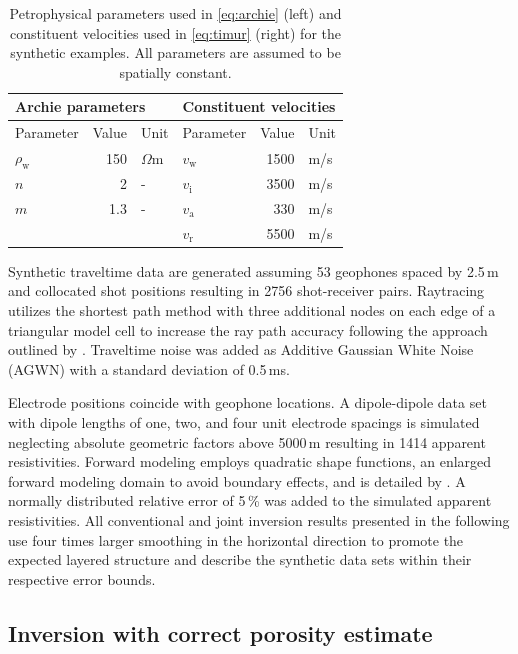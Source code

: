 \documentclass[extra]{gji}
\begin{document}
\begin{table}
 \centering
 \caption{Petrophysical parameters used in \autoref{eq:archie} (left) and constituent velocities used in \autoref{eq:timur} (right) for the synthetic examples. All parameters are assumed to be spatially constant.}
 \begin{tabular}{lrllrl}
  \toprule
  \multicolumn{3}{l}{\textbf{Archie parameters}} & \multicolumn{3}{l}{\textbf{Constituent velocities}} \\ \midrule
  Parameter       & Value & Unit      & Parameter    & Value & Unit \\ \midrule
  $\rho_\text{w}$ & 150   & $\Omega$m & $v_\text{w}$ & 1500  & m/s  \\
  $n$             & 2     & -         & $v_\text{i}$ & 3500  & m/s  \\
  $m$             & 1.3   & -         & $v_\text{a}$ & 330   & m/s  \\
                  &       &           & $v_\text{r}$ & 5500  & m/s  \\
  \bottomrule
 \end{tabular}
 \label{tab:parameters}
\end{table}

Synthetic traveltime data are generated assuming 53 geophones spaced by 2.5\,m and collocated shot positions resulting in 2756 shot-receiver pairs.
Raytracing utilizes the shortest path method with three additional nodes on each edge of a triangular model cell to increase the ray path accuracy following the approach outlined by \cite{Giroux2013}.
Traveltime noise was added as Additive Gaussian White Noise (AGWN) with a standard deviation of 0.5\,ms.

Electrode positions coincide with geophone locations.
A dipole-dipole data set with dipole lengths of one, two, and four unit electrode spacings is simulated neglecting absolute geometric factors above 5000\,m resulting in 1414 apparent resistivities.
Forward modeling employs quadratic shape functions, an enlarged forward modeling domain to avoid boundary effects, and is detailed by \cite{Ruecker2006}.
A normally distributed relative error of 5\,\% was added to the simulated apparent resistivities.
All conventional and joint inversion results presented in the following use four times larger smoothing in the horizontal direction to promote the expected layered structure and describe the synthetic data sets within their respective error bounds.

\subsection{Inversion with correct porosity estimate}
\end{document}
